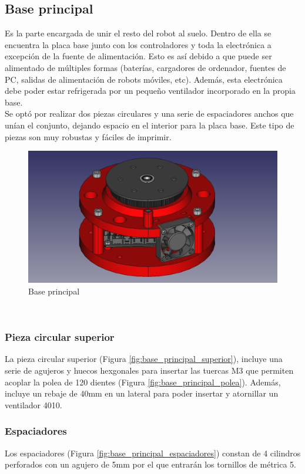 \subsection{Base principal}
\noindent Es la parte encargada de unir el resto del robot al suelo. Dentro de ella se encuentra la placa base junto con los controladores 
y toda la electrónica a excepción de la fuente de alimentación. Esto es así debido a que puede ser alimentado de múltiples formas (baterías, 
cargadores de ordenador, fuentes de PC, salidas de alimentación de robots móviles, etc). Además, esta electrónica debe poder estar refrigerada 
por un pequeño ventilador incorporado en la propia base. \\
Se optó por realizar dos piezas circulares y una serie de espaciadores anchos que unían el conjunto, dejando espacio en el interior para 
la placa base. Este tipo de piezas son muy robustas y fáciles de imprimir. 
\begin{figure} [ht!]
  \begin{center}
    \includegraphics[width=12cm]{figs/base_principal.png}
  \end{center}
  \caption{Base principal}
\end{figure}\ 

\subsubsection{Pieza circular superior}
\noindent La pieza circular superior (Figura \ref{fig:base_principal_superior}), incluye una serie de agujeros y huecos hexgonales para insertar las tuercas M3 que permiten
acoplar la polea de 120 dientes (Figura \ref{fig:base_principal_polea}). Además, incluye un rebaje de 40mm en un lateral para poder insertar y atornillar un ventilador 4010.
\subsubsection{Espaciadores}
\noindent Los espaciadores (Figura \ref{fig:base_principal_espaciadores}) constan de 4 cilindros perforados con un agujero de 5mm por el que entrarán los tornillos de métrica 5.
